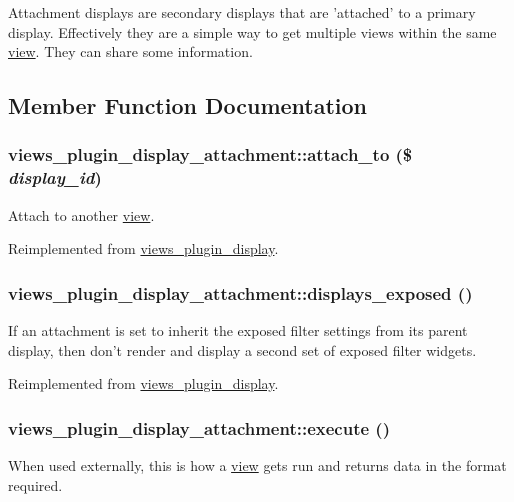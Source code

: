 Attachment displays are secondary displays that are 'attached' to a primary display. Effectively they are a simple way to get multiple views within the same \hyperlink{classview}{view}. They can share some information. 

\subsection{Member Function Documentation}
\hypertarget{classviews__plugin__display__attachment_ae8fcfc681cc9ff841ac5c0bdf1691b31}{
\subsubsection[{attach\_\-to}]{\setlength{\rightskip}{0pt plus 5cm}views\_\-plugin\_\-display\_\-attachment::attach\_\-to (\$ {\em display\_\-id})}}
\label{classviews__plugin__display__attachment_ae8fcfc681cc9ff841ac5c0bdf1691b31}
Attach to another \hyperlink{classview}{view}. 

Reimplemented from \hyperlink{classviews__plugin__display_aa74683048bca4e740cb7e25ae4c527d4}{views\_\-plugin\_\-display}.\hypertarget{classviews__plugin__display__attachment_aa047b05c7d1e48bd2ec6c98a27720ebf}{
\subsubsection[{displays\_\-exposed}]{\setlength{\rightskip}{0pt plus 5cm}views\_\-plugin\_\-display\_\-attachment::displays\_\-exposed ()}}
\label{classviews__plugin__display__attachment_aa047b05c7d1e48bd2ec6c98a27720ebf}
If an attachment is set to inherit the exposed filter settings from its parent display, then don't render and display a second set of exposed filter widgets. 

Reimplemented from \hyperlink{classviews__plugin__display_a47058532874d0bc5448b53e0a98489cc}{views\_\-plugin\_\-display}.\hypertarget{classviews__plugin__display__attachment_a5ca7a4fec7907cd236d0f73ac21f4e1e}{
\subsubsection[{execute}]{\setlength{\rightskip}{0pt plus 5cm}views\_\-plugin\_\-display\_\-attachment::execute ()}}
\label{classviews__plugin__display__attachment_a5ca7a4fec7907cd236d0f73ac21f4e1e}
When used externally, this is how a \hyperlink{classview}{view} gets run and returns data in the format required.

